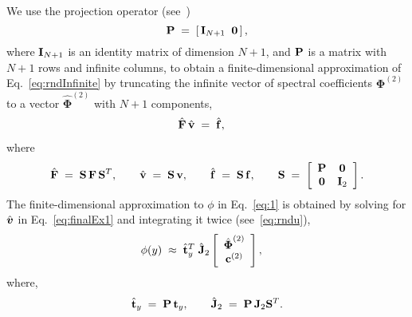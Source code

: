 \documentclass[%
secnumarabic,%
 amssymb, amsmath,%
 aps,prf,superscriptaddress,longbibliography
frontmatterverbose,
]{revtex4-2}
\newcommand{\ghmargin}[1]{\marginpar{\color{blue}\tiny\ttfamily{GH:} #1}}
\begin{document}
We use the projection operator (see~\cite[Section 2.4]{OlvTowSIAM2013}) 
\begin{equation}\label{eq:project}
  \mathbf{P} \;=\; \left[\,\mathbf I_{N+1}\;\; \mathbf 0 \,\right],
\end{equation}
where $\mathbf I_{N+1}$ is an identity matrix of dimension $N+1$, and $\mathbf{P}$ is a matrix with $N + 1$ rows and infinite columns, to obtain a finite-dimensional approximation of Eq.~\eqref{eq:rndInfinite} by truncating the infinite vector of spectral coefficients $\boldsymbol \Phi^{(2)}$ to a vector $\hat{\boldsymbol \Phi}^{(2)}$ with $N + 1$ components,
\begin{align}\label{eq:finalEx1}
  \hat{\mathbf{F}}\,\hat{\mathbf{v}} \;&=\; \hat{\mathbf{f}},
\end{align}
where
\begin{align}\label{eq:S}
\hat{\mathbf{F}} \;=\;  \mathbf{S} \,\mathbf{F} \,\mathbf{S}^T, \qquad \hat{\mathbf{v}} \;=\; \mathbf{S}\, \mathbf{v}, \qquad \hat{\mathbf{f}} \;=\; \mathbf{S}\, \mathbf{f}, \qquad \mathbf{S} \;=\; \left[\begin{array}{cc}
        \mathbf{P} & \mathbf 0 \\
        \mathbf 0 & \mathbf{I}_2
        \end{array}\right] .
\end{align}
The finite-dimensional approximation to $\phi$ in Eq.~\eqref{eq:1} is obtained by solving for $\hat{\boldsymbol v}$ in Eq.~\eqref{eq:finalEx1} and integrating it twice (see~\eqref{eq:rndu}),
\begin{align}\label{eq:finalEx1}
  \phi (y) \;&\approx \; \hat{\mathbf{t}}_y^T \;\hat{\mathbf J}_2 \left[\begin{array}{c}\hat {\boldsymbol \Phi}^{(2)} \\ \mathbf c^{(2)} \end{array}\right], 
\end{align}
where,
$$
\hat{\mathbf{t}}_y \;=\; \mathbf{P}\,\mathbf{t}_y, \qquad \hat {\mathbf{J}}_2 \;=\; \mathbf{P} \,\mathbf J_2 \mathbf{S}^T.
$$



\end{document}

